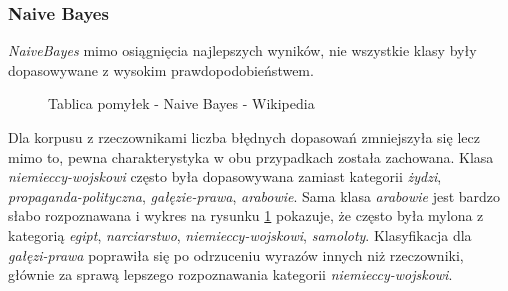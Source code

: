 \subsubsection{Naive Bayes}
\textit{NaiveBayes} mimo osiągnięcia najlepszych wyników,  nie wszystkie klasy były dopasowywane z wysokim prawdopodobieństwem.
\begin{figure}[ht!]
	\centering
    \qquad
	\caption{Tablica pomyłek - Naive Bayes - Wikipedia}
    \label{fig:c-matrix-naivebayes-wikipedia}
\end{figure}

Dla korpusu z rzeczownikami liczba błędnych dopasowań zmniejszyła się lecz mimo to, pewna charakterystyka w obu przypadkach została zachowana. Klasa \textit{niemieccy-wojskowi} często była dopasowywana zamiast kategorii \textit{żydzi}, \textit{propaganda-polityczna}, \textit{gałęzie-prawa}, \textit{arabowie}. Sama klasa \textit{arabowie} jest bardzo słabo rozpoznawana i wykres na rysunku \ref{fig:c-matrix-naivebayes-wikipedia} pokazuje, że często była mylona z kategorią \textit{egipt}, \textit{narciarstwo}, \textit{niemieccy-wojskowi}, \textit{samoloty}. Klasyfikacja dla \textit{gałęzi-prawa} poprawiła się po odrzuceniu wyrazów innych niż rzeczowniki, głównie za sprawą lepszego rozpoznawania kategorii \textit{niemieccy-wojskowi}.

